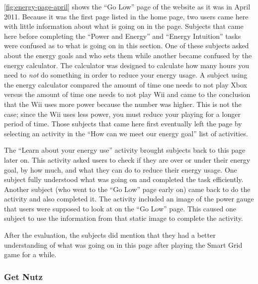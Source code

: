 \autoref{fig:energy-page-april} shows the ``Go Low'' page of the website as it was in April 2011. Because it was the first page listed in the home page, two users came here with little information about what is going on in the page. Subjects that came here before completing the ``Power and Energy'' and ``Energy Intuition'' tasks were confused as to what is going on in this section. One of these subjects asked about the energy goals and who sets them while another became confused by the energy calculator. The calculator was designed to calculate how many hours you need to \emph{not} do something in order to reduce your energy usage. A subject using the energy calculator compared the amount of time one needs to not play Xbox versus the amount of time one needs to not play Wii and came to the conclusion that the Wii uses more power because the number was higher. This is not the case; since the Wii uses less power, you must reduce your playing for a longer period of time. Those subjects that came here first eventually left the page by selecting an activity in the ``How can we meet our energy goal'' list of activities.

The ``Learn about your energy use'' activity brought subjects back to this page later on. This activity asked users to check if they are over or under their energy goal, by how much, and what they can do to reduce their energy usage. One subject fully understood what was going on and completed the task efficiently. Another subject (who went to the ``Go Low'' page early on) came back to do the activity and also completed it. The activity included an image of the power gauge that users were supposed to look at on the ``Go Low'' page. This caused one subject to use the information from that static image to complete the activity.

After the evaluation, the subjects did mention that they had a better understanding of what was going on in this page after playing the Smart Grid game for a while.

\subsubsection{Get Nutz}

